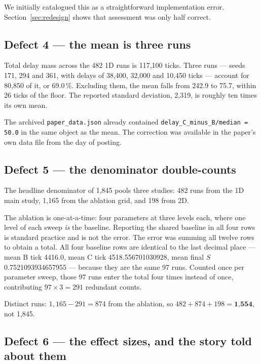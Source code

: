 \documentclass[11pt,letterpaper]{article}
\begin{document}
We initially catalogued this as a straightforward implementation error.
Section~\ref{sec:redesign} shows that assessment was only half correct.

\subsection{Defect 4 --- the mean is three runs}

Total delay mass across the 482 1D runs is 117{,}100 ticks. Three
runs --- seeds 171, 294 and 361, with delays of 38{,}400, 32{,}000 and
10{,}450 ticks --- account for 80{,}850 of it, or 69.0\,\%. Excluding
them, the mean falls from 242.9 to 75.7, within 26 ticks of the floor.
The reported standard deviation, 2{,}319, is roughly ten times its own
mean.

The archived \texttt{paper\_data.json} already contained
\texttt{delay\_C\_minus\_B/median = 50.0} in the same object as the mean.
The correction was available in the paper's own data file from the day
of posting.

\subsection{Defect 5 --- the denominator double-counts}

The headline denominator of 1{,}845 pools three studies: 482 runs from
the 1D main study, 1{,}165 from the ablation grid, and 198 from 2D.

The ablation is one-at-a-time: four parameters at three levels each,
where one level of each sweep \emph{is} the baseline. Reporting the
shared baseline in all four rows is standard practice and is not the
error. The error was summing all twelve rows to obtain a total. All four
baseline rows are identical to the last decimal place --- mean B tick
4416.0, mean C tick 4518.556701030928, mean final $S$
0.7521093934657955 --- because they are the same 97 runs. Counted once
per parameter sweep, those 97 runs enter the total four times instead of
once, contributing $97 \times 3 = 291$ redundant counts.

Distinct runs: $1{,}165 - 291 = 874$ from the ablation, so
$482 + 874 + 198 = \textbf{1{,}554}$, not 1{,}845.

\subsection{Defect 6 --- the effect sizes, and the story told about them}
\label{sec:effectsize}
\end{document}
